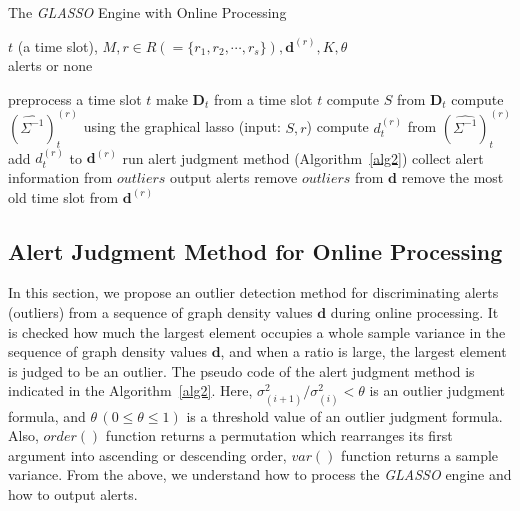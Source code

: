 \documentclass[conference]{IEEEtran}
\begin{document}
\begin{algorithm}[tb]
\caption{The {\it GLASSO} Engine with Online Processing}
\label{alg1}
\begin{algorithmic}[1]
  \REQUIRE $t$ (a time slot), $M, r \in R ( = \{r_1, r_2, \cdots, r_s\} ), \bm{d}^{(r)}, K, \theta$\\
  \ENSURE alerts or none

    \STATE preprocess a time slot $t$
    \STATE make $\bm{D}_t$ from a time slot $t$
    \STATE compute $S$ from $\bm{D}_t$
      \STATE compute ${(\hat{\Sigma^{-1}})}_t^{(r)}$ using the graphical lasso (input: $S,r$)
      \STATE compute $d_t^{(r)}$ from ${(\hat{\Sigma^{-1}})}_t^{(r)}$
      \STATE add $d_t^{(r)}$ to $\bm{d}^{(r)}$
        \STATE run alert judgment method (Algorithm~\ref{alg2})
          \STATE collect alert information from $outliers$
          \STATE output alerts
          \STATE remove $outliers$ from $\bm{d}$
        \ELSE
          \STATE remove the most old time slot from $\bm{d}^{(r)}$
        \ENDIF
  		\ENDIF
  	\ENDFOR
  \ENDFOR
\end{algorithmic}
\end{algorithm}





\subsection{Alert Judgment Method for Online Processing}
In this section, we propose an outlier detection method for discriminating alerts (outliers) from a sequence of graph density values $\bm{d}$ during online processing.
It is checked how much the largest element occupies a whole sample variance in the sequence of graph density values $\bm{d}$, and when a ratio is large, the largest element is judged to be an outlier.
The pseudo code of the alert judgment method is indicated in the Algorithm~\ref{alg2}.
Here, $\sigma^{2}_{(i+1)}/\sigma^{2}_{(i)}<\theta$ is an outlier judgment formula, and $\theta \, (0\leq \theta \leq 1)$ is a threshold value of an outlier judgment formula.
Also, $order()$ function returns a permutation which rearranges its first argument into ascending or descending order, $var()$ function returns a sample variance.
From the above, we understand how to process the {\it GLASSO} engine and how to output alerts.
\end{document}
